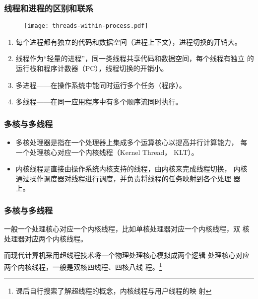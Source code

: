\begin{frame}[fragile] %
  \frametitle{线程和进程的区别和联系}

  \begin{figure}
    \centering
    \texttt{[image: threads-within-process.pdf]}
  \end{figure}
  \pause
  \begin{enumerate}\small\kai
  \item 每个进程都有独立的代码和数据空间（进程上下文），进程切换的开销大。
  \item 线程作为“轻量的进程”，同一类线程共享代码和数据空间，每个线程有独立
    的运行栈和程序计数器（PC），线程切换的开销小。
  \item 多进程——在操作系统中能同时运行多个任务（程序）。
  \item 多线程——在同一应用程序中有多个顺序流同时执行。
  \end{enumerate}
\end{frame}

\begin{frame}[fragile]
  \frametitle{多核与多线程}
  \begin{itemize}
  \item 多核处理器是指在一个处理器上集成多个运算核心以提高并行计算能力，
    每一个处理核心对应一个内核线程（Kernel Thread， KLT）。
  \item 内核线程是直接由操作系统内核支持的线程，由内核来完成线程切换，
    内核通过操作调度器对线程进行调度，并负责将线程的任务映射到各个处理
    器上。
  \end{itemize}

\end{frame}

\begin{frame}[fragile]
  \frametitle{多核与多线程}
  一般一个处理核心对应一个内核线程，比如单核处理器对应一个内核线程，双
  核处理器对应两个内核线程。

  {\Red\kai 而现代计算机采用超线程技术将一个物理处理核心模拟成两个逻辑
    处理核心对应两个内核线程，一般是双核四线程、四核八线
    程。\footnote{课后自行搜索了解超线程的概念，内核线程与用户线程的映
      射}}

  \begin{figure}
\centering
{}
\end{figure}
\end{frame}

